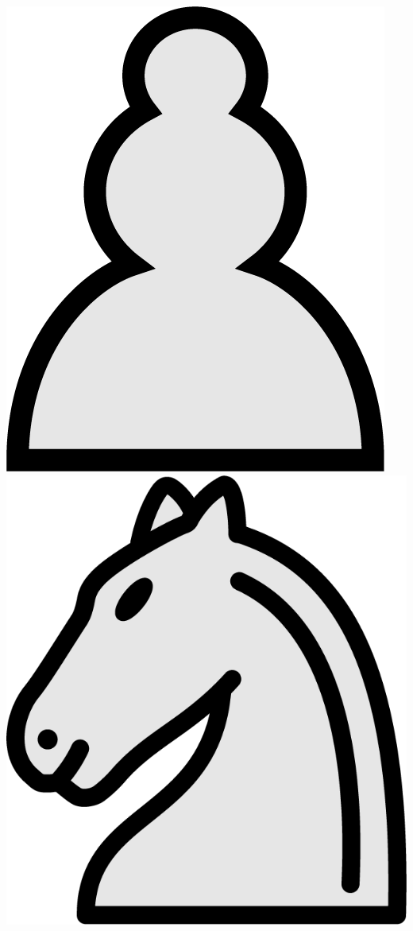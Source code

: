 \documentclass{article}
\begin{document}
\begin{center}
	\includegraphics[scale=0.07]{image6}
	\includegraphics[scale=0.07]{image10}

\end{center}
\end{document}
